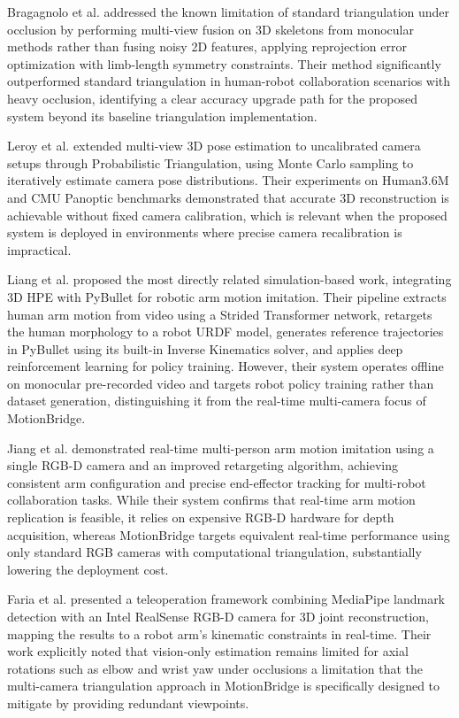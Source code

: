 Bragagnolo et al. \cite{bragagnolo2024} addressed the known limitation of standard triangulation under occlusion by performing multi-view fusion on 3D skeletons from monocular methods rather than fusing noisy 2D features, applying reprojection error optimization with limb-length symmetry constraints. Their method significantly outperformed standard triangulation in human-robot collaboration scenarios with heavy occlusion, identifying a clear accuracy upgrade path for the proposed system beyond its baseline triangulation implementation.
 
Leroy et al. \cite{leroy2023} extended multi-view 3D pose estimation to uncalibrated camera setups through Probabilistic Triangulation, using Monte Carlo sampling to iteratively estimate camera pose distributions. Their experiments on Human3.6M and CMU Panoptic benchmarks demonstrated that accurate 3D reconstruction is achievable without fixed camera calibration, which is relevant when the proposed system is deployed in environments where precise camera recalibration is impractical.
 
Liang et al. \cite{liang2024} proposed the most directly related simulation-based work, integrating 3D HPE with PyBullet for robotic arm motion imitation. Their pipeline extracts human arm motion from video using a Strided Transformer network, retargets the human morphology to a robot URDF model, generates reference trajectories in PyBullet using its built-in Inverse Kinematics solver, and applies deep reinforcement learning for policy training. However, their system operates offline on monocular pre-recorded video and targets robot policy training rather than dataset generation, distinguishing it from the real-time multi-camera focus of MotionBridge.
 
Jiang et al. \cite{jiang2025} demonstrated real-time multi-person arm motion imitation using a single RGB-D camera and an improved retargeting algorithm, achieving consistent arm configuration and precise end-effector tracking for multi-robot collaboration tasks. While their system confirms that real-time arm motion replication is feasible, it relies on expensive RGB-D hardware for depth acquisition, whereas MotionBridge targets equivalent real-time performance using only standard RGB cameras with computational triangulation, substantially lowering the deployment cost.
 
Faria et al. \cite{faria2025} presented a teleoperation framework combining MediaPipe landmark detection with an Intel RealSense RGB-D camera for 3D joint reconstruction, mapping the results to a robot arm's kinematic constraints in real-time. Their work explicitly noted that vision-only estimation remains limited for axial rotations such as elbow and wrist yaw under occlusions a limitation that the multi-camera triangulation approach in MotionBridge is specifically designed to mitigate by providing redundant viewpoints.
 
